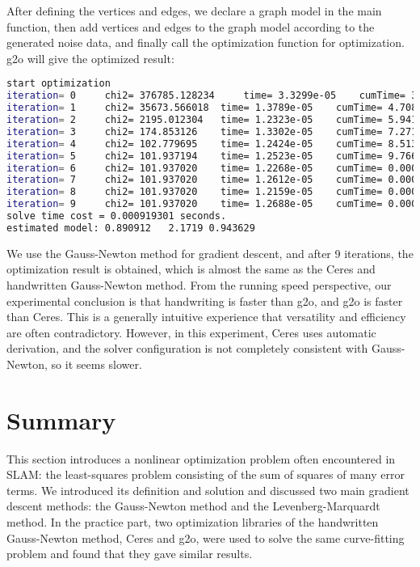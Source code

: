 After defining the vertices and edges, we declare a graph model in the main function, then add vertices and edges to the graph model according to the generated noise data, and finally call the optimization function for optimization. g2o will give the optimized result:
\begin{lstlisting}[language=sh,caption=Terminal output:]
start optimization
iteration= 0	 chi2= 376785.128234	 time= 3.3299e-05	 cumTime= 3.3299e-05	 edges= 100	 schur= 0
iteration= 1	 chi2= 35673.566018	 time= 1.3789e-05	 cumTime= 4.7088e-05	 edges= 100	 schur= 0
iteration= 2	 chi2= 2195.012304	 time= 1.2323e-05	 cumTime= 5.9411e-05	 edges= 100	 schur= 0
iteration= 3	 chi2= 174.853126	 time= 1.3302e-05	 cumTime= 7.2713e-05	 edges= 100	 schur= 0
iteration= 4	 chi2= 102.779695	 time= 1.2424e-05	 cumTime= 8.5137e-05	 edges= 100	 schur= 0
iteration= 5	 chi2= 101.937194	 time= 1.2523e-05	 cumTime= 9.766e-05	 edges= 100	 schur= 0
iteration= 6	 chi2= 101.937020	 time= 1.2268e-05	 cumTime= 0.000109928	 edges= 100	 schur= 0
iteration= 7	 chi2= 101.937020	 time= 1.2612e-05	 cumTime= 0.00012254	 edges= 100	 schur= 0
iteration= 8	 chi2= 101.937020	 time= 1.2159e-05	 cumTime= 0.000134699	 edges= 100	 schur= 0
iteration= 9	 chi2= 101.937020	 time= 1.2688e-05	 cumTime= 0.000147387	 edges= 100	 schur= 0
solve time cost = 0.000919301 seconds. 
estimated model: 0.890912   2.1719 0.943629
\end{lstlisting}

We use the Gauss-Newton method for gradient descent, and after 9 iterations, the optimization result is obtained, which is almost the same as the Ceres and handwritten Gauss-Newton method. From the running speed perspective, our experimental conclusion is that handwriting is faster than g2o, and g2o is faster than Ceres. This is a generally intuitive experience that versatility and efficiency are often contradictory. However, in this experiment, Ceres uses automatic derivation, and the solver configuration is not completely consistent with Gauss-Newton, so it seems slower.

\section{Summary}
This section introduces a nonlinear optimization problem often encountered in SLAM: the least-squares problem consisting of the sum of squares of many error terms. We introduced its definition and solution and discussed two main gradient descent methods: the Gauss-Newton method and the Levenberg-Marquardt method. In the practice part, two optimization libraries of the handwritten Gauss-Newton method, Ceres and g2o, were used to solve the same curve-fitting problem and found that they gave similar results.

